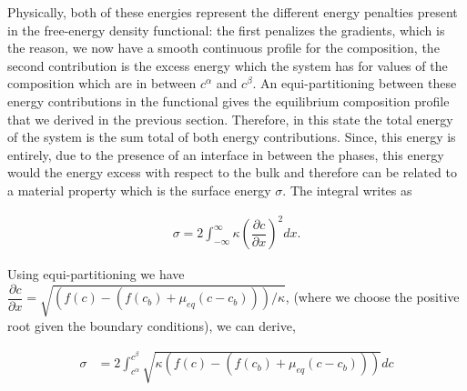 \documentclass[english]{iambook}
\begin{document}
 \begin{center}
  \end{center}

Physically, both of these energies represent the different
energy penalties present in the free-energy density functional:
the first penalizes the gradients, which is the reason, we now
have a smooth continuous profile for the composition, the second
contribution is the excess energy which the system has for
values of the composition which are in between $c^{\alpha}$ 
and $c^{\beta}$. An equi-partitioning between these energy
contributions in the functional gives the equilibrium composition
profile that we derived in the previous section. Therefore, 
in this state the total energy of the system is the sum total 
of both energy contributions. Since, this energy is entirely, 
due to the presence of an interface in between the phases, 
this energy would the energy excess with 
respect to the bulk and therefore can be related to a material
property which is the surface energy $\sigma$. The integral writes as

\begin{align}
 \sigma = 2\int_{-\infty}^{\infty}\kappa\left(\dfrac{\partial c}{\partial x}\right)^{2}dx.
\end{align}

Using equi-partitioning we have $\dfrac{\partial c}{\partial x} = 
\sqrt{(f(c) - \left(f(c_b)  + \mu_{eq}\left(c - c_b\right)\right))/\kappa}$, 
(where we choose the positive root given the boundary conditions), 
we can derive,

\begin{align}
 \sigma &= 2\int_{c^{\alpha}}^{c^{\beta}} \sqrt{\kappa(f(c) - \left(f(c_b)  + \mu_{eq}\left(c - c_b\right)\right))}dc
\end{align}
\end{document}
